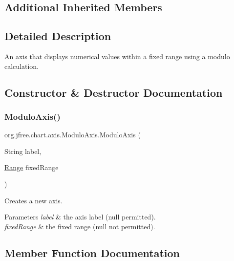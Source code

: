 \subsection*{Additional Inherited Members}


\subsection{Detailed Description}
An axis that displays numerical values within a fixed range using a modulo calculation. 

\subsection{Constructor \& Destructor Documentation}
\mbox{\label{classorg_1_1jfree_1_1chart_1_1axis_1_1_modulo_axis_ab9f3b40d9c5db575a736f56a35e999e0}} 
\subsubsection{\texorpdfstring{Modulo\+Axis()}{ModuloAxis()}}
{\footnotesize\ttfamily org.\+jfree.\+chart.\+axis.\+Modulo\+Axis.\+Modulo\+Axis (\begin{DoxyParamCaption}\item[{String}]{label,  }\item[{\mbox{\hyperlink{classorg_1_1jfree_1_1data_1_1_range}{Range}}}]{fixed\+Range }\end{DoxyParamCaption})}

Creates a new axis.


\begin{DoxyParams}{Parameters}
{\em label} & the axis label ({\ttfamily null} permitted). \\
\hline
{\em fixed\+Range} & the fixed range ({\ttfamily null} not permitted). \\
\hline
\end{DoxyParams}


\subsection{Member Function Documentation}
\mbox{\label{classorg_1_1jfree_1_1chart_1_1axis_1_1_modulo_axis_aed1941a255220f1568bd06510d21e01b}} 
